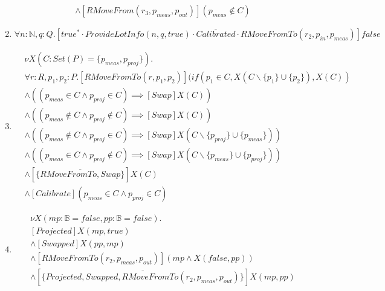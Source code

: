 \begin{enumerate}
\begin{align*}
            &\wedge [RMoveFrom(r_3,p_\mathit{meas}, p_\mathit{out})](p_\mathit{meas} \notin C)
        \end{align*}
    \item $\forall n:\mathbb{N},q:Q.[true^{*}\cdot ProvideLotInfo(n,q,true)\cdot \overline{Calibrated}\cdot RMoveFromTo(r_2, p_\mathit{in}, p_\mathit{meas})]false$
    \item \begin{align*}
    		&\nu X(C : Set(P) = \{p_\mathit{meas},p_\mathit{proj}\}).\\
            & \forall r:R, p_1, p_2 : P . [RMoveFromTo(r, p_1, p_2)](if(p_1 \in C, X(C\backslash\{p_1\}\cup\{p_2\}), X(C))\\
            &\wedge ((p_\mathit{meas} \in C \wedge p_\mathit{proj} \in C) \implies [Swap]X(C))\\
            &\wedge ((p_\mathit{meas} \notin C \wedge p_\mathit{proj} \notin C) \implies [Swap]X(C))\\
            &\wedge ((p_\mathit{meas} \notin C \wedge p_\mathit{proj} \in C) \implies [Swap]X(C\backslash\{p_\mathit{proj}\} \cup \{p_\mathit{meas}\}))\\
            &\wedge ((p_\mathit{meas} \in C \wedge p_\mathit{proj} \notin C) \implies [Swap]X(C\backslash\{p_\mathit{meas}\} \cup \{p_\mathit{proj}\}))\\
            &\wedge [\overline{\{RMoveFromTo, Swap\}}]X(C)\\
            &\wedge [Calibrate](p_\mathit{meas} \in C \wedge p_\mathit{proj} \in C)
        \end{align*}
    \item \begin{align*}
    	&\nu X(mp:\mathbb{B} = false, pp:\mathbb{B}=false).\\
    	&[Projected]X(mp, true)\\
    	&\wedge [Swapped]X(pp, mp)\\
    	&\wedge [RMoveFromTo(r_2, p_\mathit{meas}, p_\mathit{out})](mp \wedge X(false, pp))\\
    	&\wedge [\overline{\{Projected, Swapped, RMoveFromTo(r_2, p_\mathit{meas}, p_\mathit{out})\}}]X(mp, pp)
    \end{align*}
\end{enumerate}